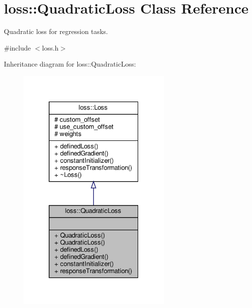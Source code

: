 \hypertarget{classloss_1_1_quadratic_loss}{}\section{loss\+:\+:Quadratic\+Loss Class Reference}
\label{classloss_1_1_quadratic_loss}


Quadratic loss for regression tasks.  




{\ttfamily \#include $<$loss.\+h$>$}



Inheritance diagram for loss\+:\+:Quadratic\+Loss\+:
\nopagebreak
\begin{figure}[H]
\begin{center}
\leavevmode
\includegraphics[width=217pt]{classloss_1_1_quadratic_loss__inherit__graph}
\end{center}
\end{figure}


